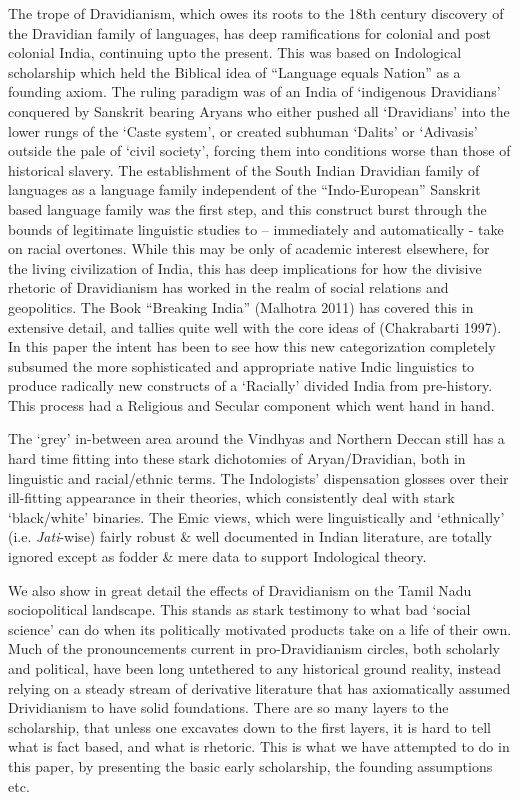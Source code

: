 \vskip -5pt

The trope of Dravidianism, which owes its roots to the 18th century discovery of the Dravidian family of languages, has deep ramifications for colonial and post colonial India, continuing upto the present. This was based on Indological scholarship which held the Biblical idea of “Language equals Nation” as a founding axiom. The ruling paradigm was of an India of ‘indigenous Dravidians’ conquered by Sanskrit bearing Aryans who either pushed all ‘Dravidians’ into the lower rungs of the ‘Caste system’, or created subhuman ‘Dalits’ or ‘Adivasis’ outside the pale of ‘civil society’, forcing them into conditions worse than those of historical slavery. The establishment of the South Indian Dravidian family of languages as a language family independent of the “Indo-European” Sanskrit based language family was the first step, and this construct burst through the bounds of legitimate linguistic studies to – immediately and automatically - take on racial overtones. While this may be only of academic interest elsewhere, for the living civilization of India, this has deep implications for how the divisive rhetoric of Dravidianism has worked in the realm of social relations and geopolitics. The Book “Breaking India” (Malhotra 2011) has covered this in extensive detail, and tallies quite well with the core ideas of (Chakrabarti 1997). In this paper the intent has been to see how this new categorization completely subsumed the more sophisticated and appropriate native Indic linguistics to produce radically new constructs of a ‘Racially’ divided India from pre-history. This process had a Religious and Secular component which went hand in hand.

The ‘grey’ in-between area around the Vindhyas and Northern Deccan still has a hard time fitting into these stark dichotomies of Aryan/Dravidian, both in linguistic and racial/ethnic terms. The Indologists’ dispensation glosses over their ill-fitting appearance in their theories, which consistently deal with stark ‘black/white’ binaries. The Emic views, which were linguistically and ‘ethnically’ (i.e. \textit{Jati}-wise) fairly robust \& well documented in Indian literature, are totally ignored except as fodder \& mere data to support Indological theory.

We also show in great detail the effects of Dravidianism on the Tamil Nadu sociopolitical landscape. This stands as stark testimony to what bad ‘social science’ can do when its politically motivated products take on a life of their own. Much of the pronouncements current in pro-Dravidianism circles, both scholarly and political, have been long untethered to any historical ground reality, instead relying on a steady stream of derivative literature that has axiomatically assumed Drividianism to have solid foundations. There are so many layers to the scholarship, that unless one excavates down to the first layers, it is hard to tell what is fact based, and what is rhetoric. This is what we have attempted to do in this paper, by presenting the basic early scholarship, the founding assumptions etc.


